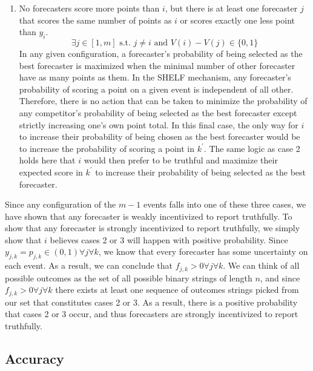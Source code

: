 \documentclass[letterpaper,12pt]{article}
\newcommand{\E}{\mathbb{E}}
\newcommand{\1}{\mathbbm{1}}
\begin{document}
\begin{enumerate}
    \item No forecasters score more points than $i$, but there is at least one forecaster $j$ that scores the same number of points as $i$ or scores exactly one less point than $y_i$.
    $$\exists j \in [1,m] \text{ s.t. } j \ne i \text{ and } V(i) - V(j) \in \{0,1\}$$
    In any given configuration, a forecaster's probability of being selected as the best forecaster is maximized when the minimal number of other forecaster have as many points as them. In the SHELF mechanism, any forecaster's probability of scoring a point on a given event is independent of all other. Therefore, there is no action that can be taken to minimize the probability of any competitor's probability of being selected as the best forecaster except strictly increasing one's own point total. In this final case, the only way for $i$ to increase their probability of being chosen as the best forecaster would be to increase the probability of scoring a point in $k^\prime$. The same logic as case 2 holds here that $i$ would then prefer to be truthful and maximize their expected score in $k^\prime$ to increase their probability of being selected as the best forecaster.
\end{enumerate}

Since any configuration of the $m-1$ events falls into one of these three cases, we have shown that any forecaster is weakly incentivized to report truthfully.
To show that any forecaster is strongly incentivized to report truthfully, we simply show that $i$ believes cases 2 or 3 will happen with positive probability. Since $y_{j,k} = p_{j,k} \in (0,1) \forall j \forall k$, we know that every forecaster has some uncertainty on each event. As a result, we can conclude that $f_{j,k} > 0 \forall j \forall k$. We can think of all possible outcomes as the set of all possible binary strings of length $n$, and since $f_{j,k} > 0 \forall j \forall k$ there exists at least one sequence of outcomes strings picked from our set that constitutes cases 2 or 3. As a result, there is a positive probability that cases 2 or 3 occur, and thus forecasters are strongly incentivized to report truthfully.  

\subsection{Accuracy}

\end{document}
